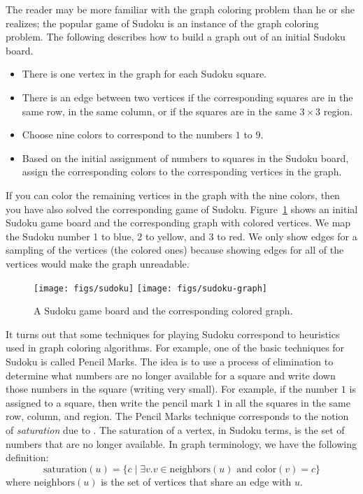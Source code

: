 \documentclass[11pt]{book}
\begin{document}
The reader may be more familiar with the graph coloring problem than he
or she realizes; the popular game of Sudoku is an instance of the
graph coloring problem. The following describes how to build a graph
out of an initial Sudoku board.
\begin{itemize}
\item There is one vertex in the graph for each Sudoku square.
\item There is an edge between two vertices if the corresponding squares
  are in the same row, in the same column, or if the squares are in
  the same $3\times 3$ region.
\item Choose nine colors to correspond to the numbers $1$ to $9$.
\item Based on the initial assignment of numbers to squares in the
  Sudoku board, assign the corresponding colors to the corresponding
  vertices in the graph.
\end{itemize}
If you can color the remaining vertices in the graph with the nine
colors, then you have also solved the corresponding game of Sudoku.
Figure~\ref{fig:sudoku-graph} shows an initial Sudoku game board and
the corresponding graph with colored vertices.  We map the Sudoku
number 1 to blue, 2 to yellow, and 3 to red.  We only show edges for a
sampling of the vertices (the colored ones) because showing edges for
all of the vertices would make the graph unreadable.

\begin{figure}[tbp]
\texttt{[image: figs/sudoku]}
\texttt{[image: figs/sudoku-graph]}
\caption{A Sudoku game board and the corresponding colored graph.}
\label{fig:sudoku-graph}
\end{figure}

It turns out that some techniques for playing Sudoku correspond to
heuristics used in graph coloring algorithms.  For example, one of the
basic techniques for Sudoku is called Pencil Marks. The idea is to use
a process of elimination to determine what numbers are no longer
available for a square and write down those numbers in the square
(writing very small). For example, if the number $1$ is assigned to a
square, then write the pencil mark $1$ in all the squares in the same
row, column, and region.
%
The Pencil Marks technique corresponds to the notion of
\emph{saturation} due to \cite{Brelaz:1979eu}.  The
saturation of a vertex, in Sudoku terms, is the set of numbers that
are no longer available. In graph terminology, we have the following
definition:
\begin{equation*}
  \mathrm{saturation}(u) = \{ c \mid \exists v. v \in \mathrm{neighbors}(u)
     \text{ and } \mathrm{color}(v) = c \}
\end{equation*}
where $\mathrm{neighbors}(u)$ is the set of vertices that share an
edge with $u$.
\end{document}

